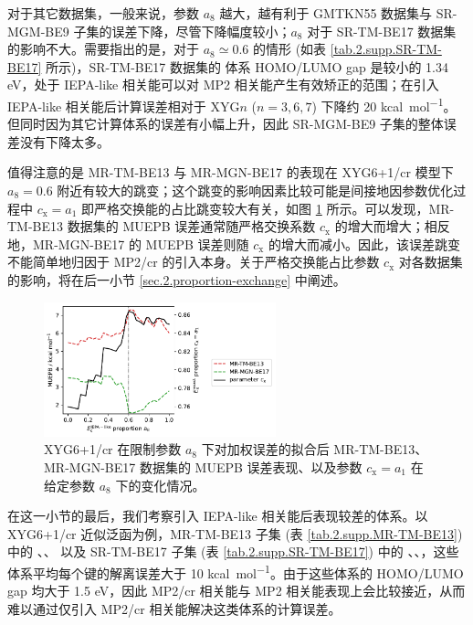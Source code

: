 对于其它数据集，一般来说，参数 $a_8$ 越大，越有利于 GMTKN55 数据集与 SR-MGM-BE9 子集的误差下降，尽管下降幅度较小；$a_8$ 对于 SR-TM-BE17 数据集的影响不大。需要指出的是，对于 $a_8 \simeq 0.6$ 的情形 (如表 \ref{tab.2.supp.SR-TM-BE17} 所示)，SR-TM-BE17 数据集的  体系 HOMO/LUMO gap 是较小的 1.34 eV，处于 IEPA-like 相关能可以对 MP2 相关能产生有效矫正的范围；在引入 IEPA-like 相关能后计算误差相对于 XYG$n$ ($n=3,6,7$) 下降约 20 \si{kcal.mol^{-1}}。但同时因为其它计算体系的误差有小幅上升，因此 SR-MGM-BE9 子集的整体误差没有下降太多。

值得注意的是 MR-TM-BE13 与 MR-MGN-BE17 的表现在 XYG6+1/cr 模型下 $a_8 = 0.6$ 附近有较大的跳变；这个跳变的影响因素比较可能是间接地因参数优化过程中 $c_\mathrm{x} = a_1$ 即严格交换能的占比跳变较大有关，如图 \ref{fig.2.plot-seq-cr-against-cx} 所示。可以发现，MR-TM-BE13 数据集的 MUEPB 误差通常随严格交换系数 $c_\mathrm{x}$ 的增大而增大；相反地，MR-MGN-BE17 的 MUEPB 误差则随 $c_\mathrm{x}$ 的增大而减小。因此，该误差跳变不能简单地归因于 MP2/cr 的引入本身。关于严格交换能占比参数 $c_\mathrm{x}$ 对各数据集的影响，将在后一小节 \ref{sec.2.proportion-exchange} 中阐述。

\begin{figure}[h]
  \centering
  \includegraphics[width=0.6\textwidth]{assets/plot-seq-cr-against-cx.pdf}
  \caption{XYG6+1/cr 在限制参数 $a_8$ 下对加权误差的拟合后 MR-TM-BE13、MR-MGN-BE17 数据集的 MUEPB 误差表现、以及参数 $c_\mathrm{x} = a_1$ 在给定参数 $a_8$ 下的变化情况。}
  \label{fig.2.plot-seq-cr-against-cx}
\end{figure}

在这一小节的最后，我们考察引入 IEPA-like 相关能后表现较差的体系。以 XYG6+1/cr 近似泛函为例，MR-TM-BE13 子集 (表 \ref{tab.2.supp.MR-TM-BE13}) 中的 、、 以及 SR-TM-BE17 子集 (表 \ref{tab.2.supp.SR-TM-BE17}) 中的 、、，这些体系平均每个键的解离误差大于 10 \si{kcal.mol^{-1}}。由于这些体系的 HOMO/LUMO gap 均大于 1.5 eV，因此 MP2/cr 相关能与 MP2 相关能表现上会比较接近，从而难以通过仅引入 MP2/cr 相关能解决这类体系的计算误差。

